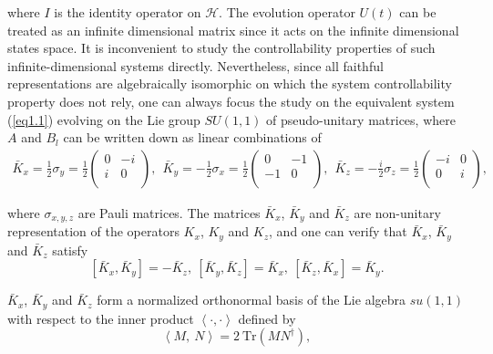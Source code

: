 \documentclass[onecolumn,showpacs,showkeys,preprintnumbers]{revtex4}
\begin{document}
\noindent where $I$ is the identity operator on $\mathcal{H}$. The
evolution operator $U(t)$ can be treated as an infinite
dimensional matrix since it acts on the infinite dimensional
states space. It is inconvenient to study the controllability
properties of such infinite-dimensional systems directly.
Nevertheless, since all faithful representations are algebraically
isomorphic on which the system controllability property does not
rely, one can always focus the study on the equivalent system
(\ref{eq1.1}) evolving on the Lie group $SU(1,1)$ of
pseudo-unitary matrices, where $A$ and $B_l$ can be written down
as linear combinations of
\noindent\begin{equation}\label{eq2.1.4}\begin{array}{l}
 \bar{K}_x=\frac{1}{2}\sigma_y=\frac{1}{2}\left(\begin{array}{cc}
  0 & -i \\
  i & 0\\
\end{array}\right),~~
\bar{K}_y=-\frac{1}{2}\sigma_x=\frac{1}{2}\left(\begin{array}{cc}
  0 & -1 \\
  -1 & 0\\
\end{array}\right),~~
 \bar{K}_z=-\frac{i}{2}\sigma_z=\frac{1}{2}\left(\begin{array}{cc}
  -i & 0 \\
  0 & i\\
\end{array}\right),
\end{array}
\end{equation}

\noindent where $\sigma_{x,y,z}$ are Pauli matrices. The matrices
$\bar{K}_x$, $\bar{K}_y$ and $\bar{K}_z$ are non-unitary
representation of the operators $K_x$, $K_y$ and $K_z$, and one
can verify that $\bar{K}_x$, $\bar{K}_y$ and $\bar{K}_z$ satisfy\noindent\begin{equation}\label{eq2.1.5}
[\bar{K}_x,\bar{K}_y]=-\bar{K}_z,~[\bar{K}_y,\bar{K}_z]=\bar{K}_x,~[\bar{K}_z,\bar{K}_x]=\bar{K}_y.
\end{equation}

\noindent $\bar{K}_x$, $\bar{K}_y$ and $\bar{K}_z$ form a
normalized orthonormal basis of the Lie algebra $su(1,1)$ with
respect to the inner product
$\left<\cdot,\cdot\right>$ defined by\noindent\begin{equation}\label{eq2.1.6}
\left<M,~N\right>=2~\mbox{Tr}(MN^\dag),
\end{equation}
\end{document}
